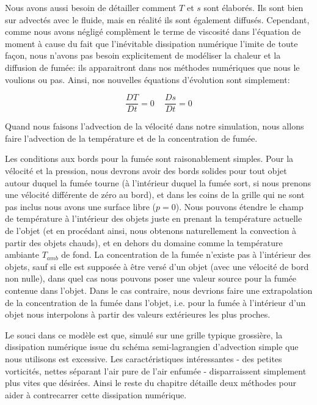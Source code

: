 \documentclass[11pt]{report}
\begin{document}
Nous avons aussi besoin de détailler comment $T$ et $s$ sont élaborés. Ils sont bien sur advectés avec le fluide, mais en réalité ils sont également diffusés. Cependant, comme nous avons négligé complèment le terme de viscosité dans l'équation de moment à cause du fait que l'inévitable dissipation numérique l'imite de toute façon, nous n'avons pas besoin explicitement de modéliser la chaleur et la diffusion de fumée: ils apparaitront dans nos méthodes numériques que nous le voulions ou pas. Ainsi, nos nouvelles équations d'évolution sont simplement:

\begin{equation}
\frac{DT}{Dt} = 0 \,\,\,\,\,\,\, \frac{Ds}{Dt} = 0
\end{equation}

Quand nous faisons l'advection de la vélocité dans notre simulation, nous allons faire l'advection de la température et de la concentration de fumée.

Les conditions aux bords pour la fumée sont raisonablement simples. Pour la vélocité et la pression, nous devrons avoir des bords solides pour tout objet autour duquel la fumée tourne (à l'intérieur duquel la fumée sort, si nous prenons une vélocité différente de zéro au bord), et dans les coins de la grille qui ne sont pas inclus nous avons une surface libre ($p=0$). Nous pouvons étendre le champ de température à l'intérieur des objets juste en prenant la température actuelle de l'objet (et en procédant ainsi, nous obtenons naturellement la convection à partir des objets chauds), et en dehors du domaine comme la température ambiante $T_{amb}$ de fond. La concentration de la fumée n'existe pas à l'intérieur des objets, sauf si elle est supposée à être versé d'un objet (avec une vélocité de bord non nulle), dans quel cas nous pouvons poser une valeur source pour la fumée contenue dans l'objet. Dans le cas contraire, nous devrions faire une extrapolation de la concentration de la fumée dans l'objet, i.e. pour la fumée à l'intérieur d'un objet nous interpolons à partir des valeurs extérieures les plus proches.\newline

Le souci dans ce modèle est que, simulé sur une grille typique grossière, la dissipation numérique issue du schéma semi-lagrangien d'advection simple que nous utilisons est excessive. Les caractéristiques intéressantes - des petites vorticités, nettes séparant l'air pure de l'air enfumée - disparraissent simplement plus vites que désirées. Ainsi le reste du chapitre détaille deux méthodes pour aider à contrecarrer cette dissipation numérique.
\end{document}
